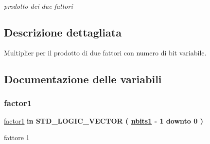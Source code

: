 \begin{DoxyCompactItemize}
\begin{DoxyCompactList}\small\item\em prodotto dei due fattori \end{DoxyCompactList}\end{DoxyCompactItemize}


\subsection{Descrizione dettagliata}
Multiplier per il prodotto di due fattori con numero di bit variabile. 



\subsection{Documentazione delle variabili}
\mbox{\label{group___multiplier_gac728adecdbfe10213256c17c1b5c5128}} 
\subsubsection{\texorpdfstring{factor1}{factor1}}
{\footnotesize\ttfamily \hyperlink{group___multiplier_gac728adecdbfe10213256c17c1b5c5128}{factor1} {\bfseries \textcolor{vhdlchar}{in}\textcolor{vhdlchar}{ }} {\bfseries \textcolor{vhdlchar}{S\+T\+D\+\_\+\+L\+O\+G\+I\+C\+\_\+\+V\+E\+C\+T\+OR}\textcolor{vhdlchar}{ }\textcolor{vhdlchar}{(}\textcolor{vhdlchar}{ }\textcolor{vhdlchar}{ }\textcolor{vhdlchar}{ }\textcolor{vhdlchar}{ }{\bfseries \hyperlink{group___multiplier_ga4ede473cdc13e75fe66fbd548b62e432}{nbits1}} \textcolor{vhdlchar}{-\/}\textcolor{vhdlchar}{ } \textcolor{vhdldigit}{1} \textcolor{vhdlchar}{ }\textcolor{vhdlchar}{downto}\textcolor{vhdlchar}{ }\textcolor{vhdlchar}{ } \textcolor{vhdldigit}{0} \textcolor{vhdlchar}{ }\textcolor{vhdlchar}{)}\textcolor{vhdlchar}{ }} \hspace{0.3cm}{\ttfamily [Port]}}



fattore 1 

\mbox{\label{group___multiplier_gac140852334303b430bbd49689cc689dd}} 

